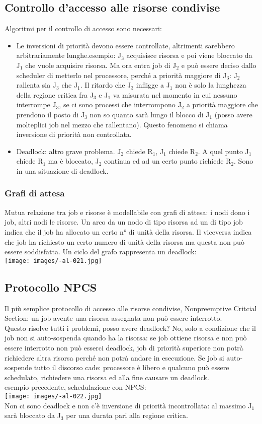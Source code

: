 \documentclass{article}
\begin{document}
\subsection{Controllo d'accesso alle risorse condivise}
Algoritmi per il controllo di accesso sono necessari:
\begin{itemize}
\item Le inversioni di priorità devono essere controllate, altrimenti sarebbero arbitrariamente lunghe.esempio: J$_{3}$ acquisisce risorsa e poi viene bloccato da J$_{1}$ che vuole acquisire risorsa. Ma ora entra job di J$_{2}$ e può essere deciso dallo scheduler di metterlo nel processore, perché a priorità maggiore di J$_{3}$: J$_{2}$ rallenta sia J$_{3}$ che J$_{1}$. Il ritardo che J$_{3}$ infligge a J$_{1}$ non è solo la lunghezza della regione critica fra J$_{3}$ e J$_{1}$ va misurata nel momento in cui nessuno interrompe J$_{3}$, se ci sono processi che interrompono J$_{2}$ a priorità maggiore che prendono il posto di J$_{3}$ non so quanto sarà lungo il blocco di J$_{1}$ (posso avere molteplici job nel mezzo che rallentano). Questo fenomeno si chiama inversione di priorità non controllata.
\item Deadlock: altro grave problema. J$_{2}$ chiede R$_{1}$, J$_{1}$ chiede R$_{2}$. A quel punto J$_{1}$ chiede R$_{1}$ ma è bloccato, J$_{2}$ continua ed ad un certo punto richiede R$_{2}$. Sono in una situazione di deadlock.
\end{itemize}
\subsubsection{Grafi di attesa}
Mutua relazione tra job e risorse è modellabile con grafi di attesa: i nodi dono i job, altri nodi le risorse. Un arco da un nodo di tipo risorsa ad un di tipo job indica che il job ha allocato un certo n° di unità della risorsa. Il viceversa indica che job ha richiesto un certo numero di unità della risorsa ma questa non può essere soddisfatta. Un ciclo del grafo rappresenta un deadlock:\\
\texttt{[image: images/-al-021.jpg]}
\subsection{Protocollo NPCS}
Il più semplice protocollo di accesso alle risorse condivise, Nonpreemptive Critcial Section: un job avente una risorsa assegnata non può essere interrotto.\\ Questo risolve tutti i problemi, posso avere deadlock? No, solo a condizione che il job non si auto-sospenda quando ha la risorsa: se job ottiene risorsa e non può essere interrotto non può esserci deadlock, job di priorità superiore non potrà richiedere altra risorsa perché non potrà andare in esecuzione. Se job si auto-sospende tutto il discorso cade: processore è libero e qualcuno può essere schedulato, richiedere una risorsa ed alla fine causare un deadlock.\\ esempio precedente,  schedulazione con NPCS:\\
\texttt{[image: images/-al-022.jpg]}\\
Non ci sono deadlock e non c'è inversione di priorità incontrollata: al massimo J$_{1}$ sarà bloccato da J$_{3}$ per una durata pari alla regione critica.
\end{document}

